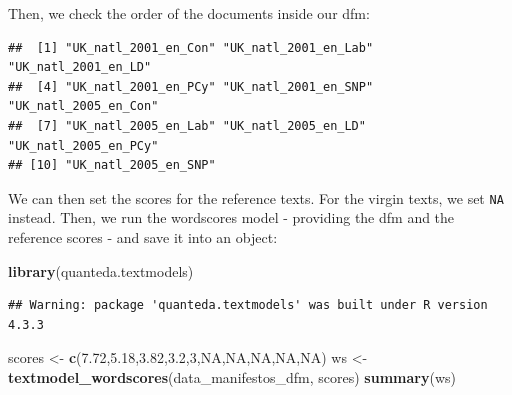 \documentclass[
]{book}
\newenvironment{Shaded}{\begin{snugshade}}{\end{snugshade}}
\newcommand{\ConstantTok}[1]{\textcolor[rgb]{0.56,0.35,0.01}{#1}}
\newcommand{\DecValTok}[1]{\textcolor[rgb]{0.00,0.00,0.81}{#1}}
\newcommand{\FloatTok}[1]{\textcolor[rgb]{0.00,0.00,0.81}{#1}}
\newcommand{\FunctionTok}[1]{\textcolor[rgb]{0.13,0.29,0.53}{\textbf{#1}}}
\newcommand{\NormalTok}[1]{#1}
\newcommand{\OtherTok}[1]{\textcolor[rgb]{0.56,0.35,0.01}{#1}}
\newcommand{\SpecialCharTok}[1]{\textcolor[rgb]{0.81,0.36,0.00}{\textbf{#1}}}
\begin{document}
Then, we check the order of the documents inside our dfm:

\begin{Shaded}
\end{Shaded}

\begin{verbatim}
##  [1] "UK_natl_2001_en_Con" "UK_natl_2001_en_Lab" "UK_natl_2001_en_LD" 
##  [4] "UK_natl_2001_en_PCy" "UK_natl_2001_en_SNP" "UK_natl_2005_en_Con"
##  [7] "UK_natl_2005_en_Lab" "UK_natl_2005_en_LD"  "UK_natl_2005_en_PCy"
## [10] "UK_natl_2005_en_SNP"
\end{verbatim}

We can then set the scores for the reference texts. For the virgin texts, we set \texttt{NA} instead. Then, we run the wordscores model - providing the dfm and the reference scores - and save it into an object:

\begin{Shaded}
\begin{Highlighting}[]
\FunctionTok{library}\NormalTok{(quanteda.textmodels)}
\end{Highlighting}
\end{Shaded}

\begin{verbatim}
## Warning: package 'quanteda.textmodels' was built under R version 4.3.3
\end{verbatim}

\begin{Shaded}
\begin{Highlighting}[]
\NormalTok{scores }\OtherTok{\textless{}{-}} \FunctionTok{c}\NormalTok{(}\FloatTok{7.72}\NormalTok{,}\FloatTok{5.18}\NormalTok{,}\FloatTok{3.82}\NormalTok{,}\FloatTok{3.2}\NormalTok{,}\DecValTok{3}\NormalTok{,}\ConstantTok{NA}\NormalTok{,}\ConstantTok{NA}\NormalTok{,}\ConstantTok{NA}\NormalTok{,}\ConstantTok{NA}\NormalTok{,}\ConstantTok{NA}\NormalTok{)}
\NormalTok{ws }\OtherTok{\textless{}{-}} \FunctionTok{textmodel\_wordscores}\NormalTok{(data\_manifestos\_dfm, scores)}
\FunctionTok{summary}\NormalTok{(ws)}
\end{Highlighting}
\end{Shaded}
\end{document}
